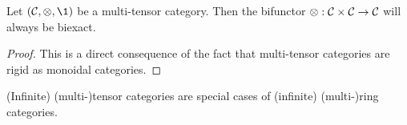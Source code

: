         \begin{proposition} \label{prop: biexactness_of_tensor_products}
            \cite[Proposition 4.2.1]{EGNO} Let $(\C, \tensor, \1)$ be a multi-tensor category. Then the bifunctor $\tensor: \C \x \C \to \C$ will always be biexact. 
        \end{proposition}
            \begin{proof}
                This is a direct consequence of the fact that multi-tensor categories are rigid as monoidal categories. 
            \end{proof}
        \begin{corollary}
            (Infinite) (multi-)tensor categories are special cases of (infinite) (multi-)ring categories.
        \end{corollary}
        
